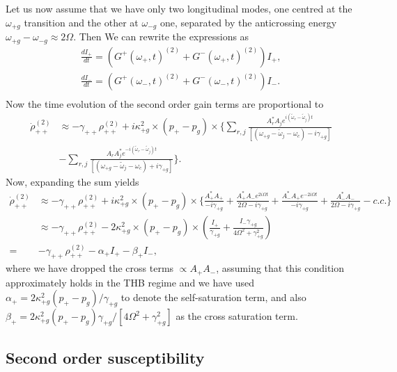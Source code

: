 \documentclass[preprint,secnumarabic,amssymb, nobibnotes, aip, prd]{revtex4-1}
\def\tw{\tilde{\omega}}
\def\tw{\tilde{\omega}}
\begin{document}
	Let us now assume that we have only two longitudinal modes, one centred at the $\omega_{+g}$ transition and the other at $\omega_{-g}$ one, separated by the anticrossing energy $\omega_{+g}-\omega_{-g}\approx 2\Omega$. Then We can rewrite the expressions as 
	\begin{align}
	\frac{dI_+}{dt} = (G^{+}(\omega_+,t)^{(2)}+G^{-}(\omega_+,t)^{(2)})I_+, \\
	\frac{dI_-}{dt} = (G^{+}(\omega_-,t)^{(2)}+G^{-}(\omega_-,t)^{(2)})I_-. \\
	\end{align}
	Now the time evolution of the second order gain terms are proportional to 
	\begin{align}
	\dot{\rho}_{++}^{(2)} &\approx -\gamma_{++}\rho_{++}^{(2)} + i\kappa_{+g}^2\times (p_+-p_g) \times 
	\Big \{
	\sum_{r,j} \frac{A_r^*A_je^{i(\tw_r-\tw_j)t}}{[( \omega_{+ g} - \tw_j-\omega_c) -i\gamma_{+ g}]} \nonumber \\
	&- \sum_{r,j} \frac{A_rA_j^*e^{-i(\tw_r-\tw_j)t}}{[( \omega_{+ g} - \tw_j-\omega_c) +i\gamma_{+ g}]}
	\Big \}.
	\end{align}
	Now, expanding the sum yields
	\begin{align}
	\dot{\rho}_{++}^{(2)} &\approx -\gamma_{++}\rho_{++}^{(2)} + i\kappa_{+g}^2\times (p_+-p_g) \times 
	\Big \{
	\frac{A_+^*A_+}{ -i\gamma_{+ g}} + \frac{A_+^*A_-e^{2i\Omega t}}{2\Omega  -i\gamma_{+ g} }	+ \frac{A_-^*A_+e^{-2i\Omega t}}{ -i\gamma_{+ g}}	+ \frac{A_-^*A_-}{2\Omega -i\gamma_{+ g}}	- c.c.
	\Big \} \nonumber \\
	&\approx -\gamma_{++}\rho_{++}^{(2)} -2\kappa_{+g}^2\times (p_+-p_g) \times \left (	\frac{I_+}{ \gamma_{+ g}} +\frac{I_-\gamma_{+g}}{4\Omega^2+\gamma_{+g}^2} \right ) \nonumber \\
	=& -\gamma_{++}\rho_{++}^{(2)}  -\alpha_+ I_+ -\beta_{+}I_-,
	\end{align}
	where we have dropped the cross terms $\propto A_+A_-$, assuming that this condition approximately holds in the THB regime and we have used $\alpha_+ = 2\kappa_{+g}^2(p_+-p_g)/\gamma_{+g} $ to denote the self-saturation term, and also $\beta_+ = 2\kappa_{+g}^2(p_+-p_g)\gamma_{+g}/[4\Omega^2+\gamma_{+g}^2]$ as the cross saturation term. 
	
	
	
	
	\newpage
	\subsection{Second order susceptibility}
	
\end{document}
